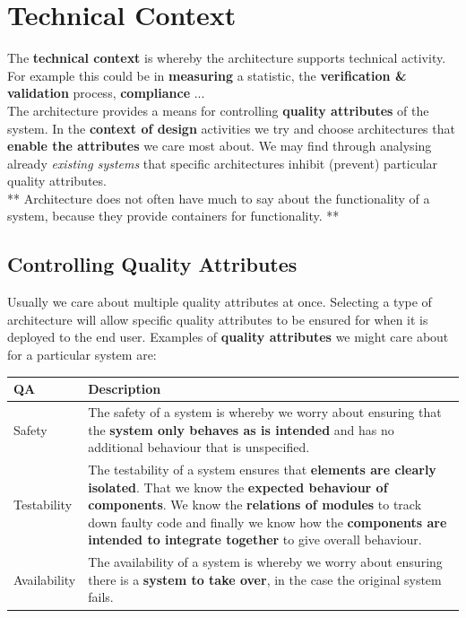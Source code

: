 \documentclass[a4paper]{report}
\begin{document}
\section{Technical Context}
The \textbf{technical context} is whereby the architecture supports technical activity. For example this could be in \textbf{measuring} a statistic, the \textbf{verification \& validation} process, \textbf{compliance} ...\\

The architecture provides a means for controlling \textbf{quality attributes} of the system. In the \textbf{context of design} activities we try and choose architectures that \textbf{enable the attributes} we care most about. We may find through analysing already \textit{existing systems} that specific architectures inhibit (prevent) particular quality attributes.\\

** Architecture does not often have much to say about the functionality of a system, because they provide containers for functionality. **

\subsection{Controlling Quality Attributes}

Usually we care about multiple quality attributes at once. Selecting a type of architecture will allow specific quality attributes to be ensured for when it is deployed to the end user. Examples of \textbf{quality attributes} we might care about for a particular system are:

\begin{table}[H]
\begin{tabular}{|l|p{10cm}|}
\hline
QA & Description\\
\hline
Safety & The safety of a system is whereby we worry about ensuring that the \textbf{system only behaves as is intended} and has no additional behaviour that is unspecified.\\
\hline
Testability & The testability of a system ensures that \textbf{elements are clearly isolated}. That we know the \textbf{expected behaviour of components}. We know the \textbf{relations of modules} to track down faulty code and finally we know how the \textbf{components are intended to integrate together} to give overall behaviour.\\
\hline
Availability & The availability of a system is whereby we worry about ensuring there is a \textbf{system to take over}, in the case the original system fails. \\
\hline
\end{tabular}
\end{table}
\end{document}
